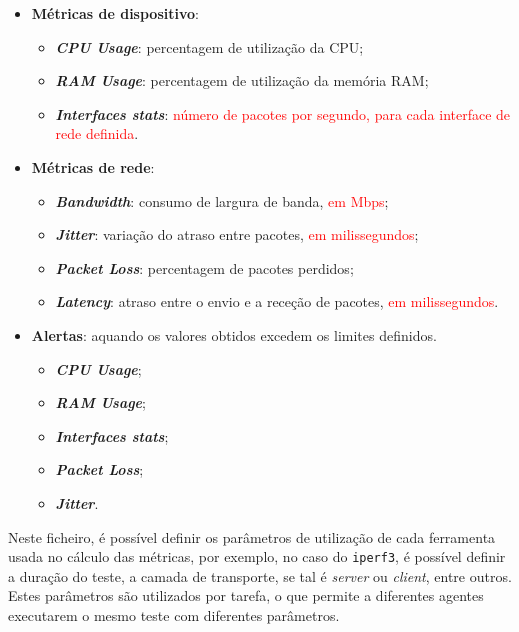 \documentclass[a4paper,12pt]{scrreprt}
\begin{document}
\begin{itemize}
    \item \textbf{Métricas de dispositivo}:
    \begin{itemize}
        \item \textbf{\textit{CPU Usage}}: percentagem de utilização da CPU;
        \item \textbf{\textit{RAM Usage}}: percentagem de utilização da memória RAM;
        \item \textbf{\textit{Interfaces stats}}: \textcolor{red}{número de pacotes por segundo,
            para cada interface de rede definida}.
    \end{itemize}
    \item \textbf{Métricas de rede}:
    \begin{itemize}
        \item \textbf{\textit{Bandwidth}}: consumo de largura de banda, \textcolor{red}{em Mbps};
        \item \textbf{\textit{Jitter}}: variação do atraso entre pacotes, \textcolor{red}{em milissegundos};
        \item \textbf{\textit{Packet Loss}}: percentagem de pacotes perdidos;
        \item \textbf{\textit{Latency}}: atraso entre o envio e a receção de pacotes, \textcolor{red}{em milissegundos}.
    \end{itemize}
    \item \textbf{Alertas}: aquando os valores obtidos excedem os limites definidos.
    \begin{itemize}
        \item \textbf{\textit{CPU Usage}};
        \item \textbf{\textit{RAM Usage}};
        \item \textbf{\textit{Interfaces stats}};
        \item \textbf{\textit{Packet Loss}};
        \item \textbf{\textit{Jitter}}.
    \end{itemize}
\end{itemize}

Neste ficheiro, é possível definir os parâmetros de utilização de cada ferramenta usada no cálculo das métricas,
por exemplo, no caso do \texttt{iperf3}, é possível definir a duração do teste, a camada de transporte, se tal é
\textit{server} ou \textit{client}, entre outros. Estes parâmetros são utilizados por tarefa, o que permite a
diferentes agentes executarem o mesmo teste com diferentes parâmetros.
\end{document}
